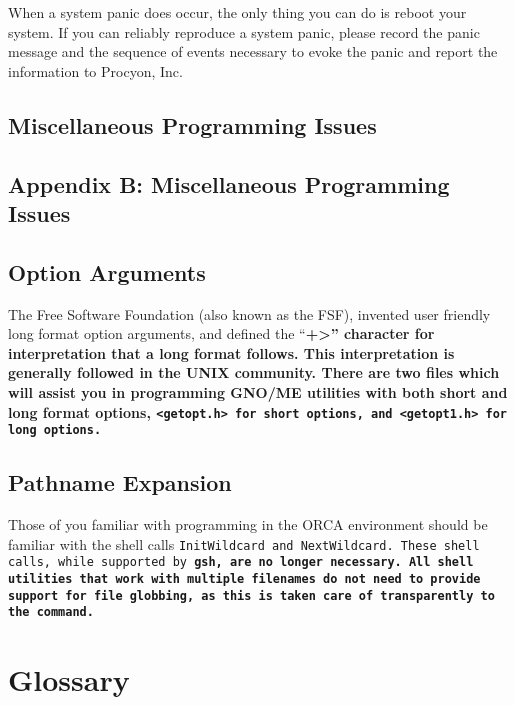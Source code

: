 \documentclass{report}
\begin{document}
When a system panic does occur, the only
thing you can do is reboot your system. If you can reliably
reproduce a system panic, please record the panic message and the
sequence of events necessary to evoke the panic and report the
information to Procyon, Inc.

%
%

\begin{latexonly}
\chapter{Miscellaneous Programming Issues}
\end{latexonly}
\begin{htmlonly}
\chapter{Appendix B:  Miscellaneous Programming Issues}
\end{htmlonly}

\section{Option Arguments}

The Free Software Foundation (also known as the
FSF), invented user friendly long format option arguments, and
defined the ``\bf +\rm>'' character for interpretation
that a long format follows. This interpretation is generally
followed in the UNIX community. There are two files which will assist
you in programming GNO/ME utilities with both short and long
format options, \tt <getopt.h> \rm for short options, and
\tt <getopt1.h> \rm for long options.

\section{Pathname Expansion}

Those of you familiar with programming in
the ORCA environment should be familiar with the shell calls
\tt InitWildcard \rm and \tt NextWildcard\rm.
These shell calls, while supported by \bf gsh\rm,
are no longer necessary. All shell utilities that work with
multiple filenames do not need to provide support for file
globbing, as this is taken care of transparently to the command.

%
%

\chapter{Glossary}
\end{document}
